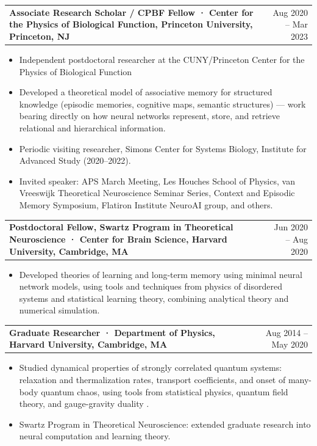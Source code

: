 \documentclass[11pt, letterpaper]{article}
\makeatletter
\newcommand{\entry}[2]{%
  \noindent
  \begin{tabularx}{\linewidth}{@{}X@{\hspace{4pt}}r@{}}
    \textbf{#1} & \textcolor{midgray}{\small #2}
  \end{tabularx}\vspace{1pt}%
}
\makeatother
\begin{document}
\vspace{6pt}
\entry{Associate Research Scholar / CPBF Fellow · Center for the Physics of Biological
Function, Princeton University, Princeton, NJ}{Aug 2020 – Mar 2023}
\begin{itemize}
  \item Independent postdoctoral researcher at the CUNY/Princeton Center for the
        Physics of Biological Function
  \item Developed a theoretical model of associative memory for structured knowledge
        (episodic memories, cognitive maps, semantic structures) — work bearing directly
        on how neural networks represent, store, and retrieve relational and hierarchical information.
  \item Periodic visiting researcher, Simons Center for Systems Biology, Institute for
        Advanced Study (2020–2022).
  \item Invited speaker: APS March Meeting, Les Houches School of Physics, van
        Vreeswijk Theoretical Neuroscience Seminar Series, Context and Episodic Memory
        Symposium, Flatiron Institute NeuroAI group, and others.
\end{itemize}

\vspace{6pt}
\entry{Postdoctoral Fellow, Swartz Program in Theoretical Neuroscience · Center for
Brain Science, Harvard University, Cambridge, MA}{Jun 2020 – Aug 2020}
\begin{itemize}
  \item Developed theories of learning and long-term memory using minimal neural network
        models, using tools and techniques from physics of disordered systems and statistical learning theory, combining analytical theory and numerical simulation.
\end{itemize}

\vspace{6pt}
\entry{Graduate Researcher · Department of Physics, Harvard University, Cambridge, MA}{Aug 2014 – May 2020}
\begin{itemize}
  \item Studied dynamical properties of strongly correlated quantum systems:
        relaxation and thermalization rates, transport coefficients, and onset of
        many-body quantum chaos, using tools from statistical physics, quantum field theory, and
        gauge-gravity duality .
  \item Swartz Program in Theoretical Neuroscience: extended graduate research into
        neural computation and learning theory.
\end{itemize}
\end{document}
